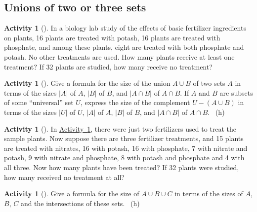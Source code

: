\documentclass[10pt,]{book}
\theoremstyle{plain}
\theoremstyle{definition}
\theoremstyle{definition}
\theoremstyle{definition}
\newtheorem{activity}[project]{Activity}
\numberwithin{equation}{chapter}
\begin{document}
\subsection[{Unions of two or three sets}]{Unions of two or three sets}\label{subsection-26}
\begin{activity}[]\label{fertilizer2}
\hypertarget{p-1166}{}%
In a biology lab study of the effects of basic fertilizer ingredients on plants, 16 plants are treated with potash, 16 plants are treated with phosphate, and among these plants, eight are treated with both phosphate and potash. No other treatments are used. How many plants receive at least one treatment? If 32 plants are studied, how many receive no treatment?%
\end{activity}
\begin{activity}[]\label{twosetintersection}
\hypertarget{p-1168}{}%
Give a formula for the size of the union \(A\cup B\) of two sets \(A\) in terms of the sizes \(|A|\) of \(A\), \(|B|\) of \(B\), and \(|A\cap B|\) of \(A\cap B\). If \(A\) and \(B\) are subsets of some ``universal'' set \(U\), express the size of the complement \(U-(A\cup B)\) in terms of the sizes \(|U|\) of \(U\), \(|A|\) of \(A\), \(|B|\) of \(B\), and \(|A\cap B|\) of \(A\cap B\).%
~{\tiny (h)}\end{activity}
\begin{activity}[]\label{activity-211}
\hypertarget{p-1172}{}%
In \hyperref[fertilizer2]{Activity~\ref{fertilizer2}}, there were just two fertilizers used to treat the sample plants. Now suppose there are three fertilizer treatments, and 15 plants are treated with nitrates, 16 with potash, 16 with phosphate, 7 with nitrate and potash, 9 with nitrate and phosphate, 8 with potash and phosphate and 4 with all three. Now how many plants have been treated? If 32 plants were studied, how many received no treatment at all?%
\end{activity}
\begin{activity}[]\label{threesetintersection}
\hypertarget{p-1174}{}%
Give a formula for the size of \(A\cup B\cup C\) in terms of the sizes of \(A\), \(B\), \(C\) and the intersections of these sets.%
~{\tiny (h)}\end{activity}
\typeout{************************************************}
\typeout{************************************************}
\end{document}
